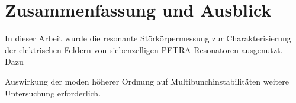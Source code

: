 \chapter{Zusammenfassung und Ausblick}
\label{sec:fazit}

In dieser Arbeit wurde die resonante Störkörpermessung zur Charakterisierung der elektrischen Feldern von siebenzelligen PETRA-Resonatoren ausgenutzt.
Dazu 

Auswirkung der moden höherer Ordnung auf Multibunchinstabilitäten weitere Untersuchung erforderlich.